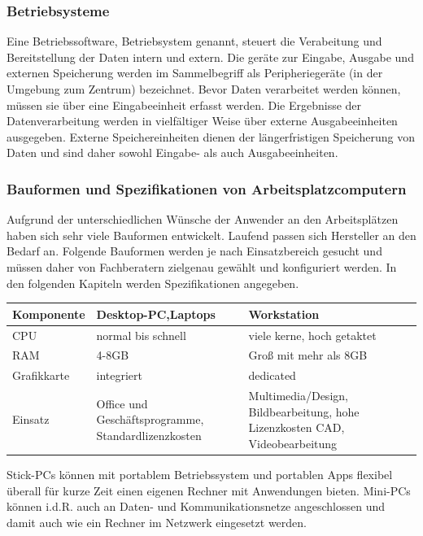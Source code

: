 \documentclass[a4paper, 12pt]{report}
\begin{document}
\begin{multicols}{2}
\subsubsection{Betriebsysteme}

Eine Betriebssoftware, Betriebsystem genannt, steuert die Verabeitung und
Bereitstellung der Daten intern und extern. Die geräte zur Eingabe, Ausgabe und
externen Speicherung werden im Sammelbegriff als Peripheriegeräte (in der
Umgebung zum Zentrum) bezeichnet. Bevor Daten verarbeitet werden können, müssen
sie über eine Eingabeeinheit erfasst werden. Die Ergebnisse der
Datenverarbeitung werden in vielfältiger Weise über externe Ausgabeeinheiten
ausgegeben. Externe Speichereinheiten dienen der längerfristigen Speicherung von
Daten und sind daher sowohl Eingabe- als auch Ausgabeeinheiten.

\subsubsection{Bauformen und Spezifikationen von Arbeitsplatzcomputern}

Aufgrund der unterschiedlichen Wünsche der Anwender an den Arbeitsplätzen haben
sich sehr viele Bauformen entwickelt. Laufend passen sich Hersteller an den
Bedarf an. Folgende Bauformen werden je nach Einsatzbereich gesucht und müssen
daher von Fachberatern zielgenau gewählt und konfiguriert werden. In den
folgenden Kapiteln werden Spezifikationen angegeben.

\begin{tabular}{ | l | p{6cm} | p{6cm} | }
    \hline
    Komponente & Desktop-PC,Laptops & Workstation \\ \hline
    CPU & normal bis schnell & viele kerne, hoch getaktet \\ \hline
    RAM & 4-8GB & Groß mit mehr als 8GB \\ \hline
    Grafikkarte & integriert & dedicated \\ \hline
    Einsatz & Office und Geschäftsprogramme, \newline Standardlizenzkosten &
    Multimedia/Design, Bildbearbeitung, \newline hohe Lizenzkosten CAD,
    Videobearbeitung \\
    \hline
\end{tabular}

Stick-PCs können mit portablem Betriebssystem und portablen Apps flexibel
überall für kurze Zeit einen eigenen Rechner mit Anwendungen bieten. Mini-PCs
können i.d.R. auch an Daten- und Kommunikationsnetze angeschlossen und damit
auch wie ein Rechner im Netzwerk eingesetzt werden. \\


\end{multicols}
\end{document}
